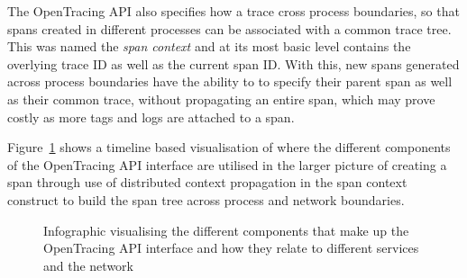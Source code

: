 \documentclass[12pt,pdftex,titlepage]{report}
\begin{document}
                The OpenTracing API also specifies how a trace cross process boundaries, so that spans created in different processes can be
                associated with a common trace tree. This was named the \textit{span context} and at its most basic level contains the 
                overlying trace ID as well as the current span ID. With this, new spans generated across process boundaries have the ability to
                to specify their parent span as well as their common trace, without propagating an entire span, which may prove costly as more
                tags and logs are attached to a span.

                Figure~\ref{fig:opentracing} shows a timeline based visualisation of where the different components of the OpenTracing API interface are utilised in
                the larger picture of creating a span through use of distributed context propagation in the span context construct to build the span tree across
                process and network boundaries.
                
                \begin{figure}[hbt!]
                    \centering
                    \caption[Relationship between OpenTracing components]{Infographic visualising the different components that make up the OpenTracing API interface and how they relate to different services
                    and the network}
                    \label{fig:opentracing}
                \end{figure}
\end{document}
